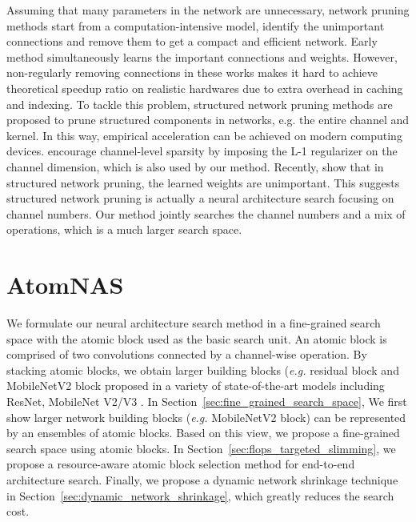 \documentclass{article} \usepackage{iclr2020_conference,times}
\begin{document}
Assuming that many parameters in the network are unnecessary, network pruning methods start from a computation-intensive model, identify the unimportant connections and remove them to get a compact and efficient network. Early method \citep{song2016deep_compression} simultaneously learns the important connections and weights. However, non-regularly removing connections in these works makes it hard to achieve theoretical speedup ratio on realistic hardwares due to extra overhead in caching and indexing. To tackle this problem, structured network pruning methods \citep{yihui2017channel,zhuang2017slimming,jianhao2017thinet,jianbo2018rethink_smallnorm,gordon2018morphnet} are proposed to prune structured components in networks, e.g. the entire channel and kernel. In this way, empirical acceleration can be achieved on modern computing devices.
\cite{zhuang2017slimming,jianbo2018rethink_smallnorm,gordon2018morphnet} encourage channel-level sparsity by imposing the L-1 regularizer on the channel dimension, which is also used by our method.
Recently, \cite{liu2019rethink_pruning} show that in structured network pruning, the learned weights are unimportant. This suggests structured network pruning is actually a neural architecture search focusing on channel numbers.
Our method jointly searches the channel numbers and a mix of operations, which is a much larger search space.



\section{AtomNAS}

We formulate our neural architecture search method in a fine-grained search space with the atomic block used as the basic search unit. An atomic block is comprised of two convolutions connected by a channel-wise operation. By stacking atomic blocks, we obtain larger building blocks (\textit{e.g.} residual block and MobileNetV2 block proposed in a variety of state-of-the-art models including ResNet, MobileNet V2/V3 \citep{he2016resnet,howard2019mobilenetv3,sandler2018mobilenetv2}. In Section~\ref{sec:fine_grained_search_space}, We first show larger network building blocks (\textit{e.g.} MobileNetV2 block) can be represented by an ensembles of atomic blocks. Based on this view, we propose a fine-grained search space using atomic blocks. In Section~\ref{sec:flops_targeted_slimming}, we propose a resource-aware atomic block selection method for end-to-end architecture search. Finally, we propose a dynamic network shrinkage technique in Section~\ref{sec:dynamic_network_shrinkage}, which greatly reduces the search cost.
\end{document}

